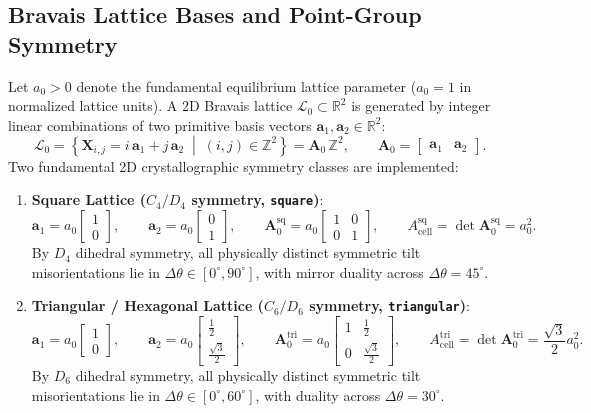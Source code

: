\documentclass[11pt,a4paper]{article}
\newcommand{\R}{\mathbb{R}}
\newcommand{\Z}{\mathbb{Z}}
\newcommand{\code}[1]{\texttt{#1}}
\begin{document}
\subsection{Bravais Lattice Bases and Point-Group Symmetry}
Let $a_0 > 0$ denote the fundamental equilibrium lattice parameter ($a_0 = 1$ in normalized lattice units). A 2D Bravais lattice $\mathcal{L}_0 \subset \R^2$ is generated by integer linear combinations of two primitive basis vectors $\mathbf{a}_1, \mathbf{a}_2 \in \R^2$:
\begin{equation}
  \mathcal{L}_0 = \left\{ \mathbf{X}_{i,j} = i\,\mathbf{a}_1 + j\,\mathbf{a}_2 \;\middle|\; (i,j) \in \Z^2 \right\} = \mathbf{A}_0\,\Z^2, \qquad \mathbf{A}_0 = \begin{bmatrix} \mathbf{a}_1 & \mathbf{a}_2 \end{bmatrix}.
\end{equation}
Two fundamental 2D crystallographic symmetry classes are implemented:
\begin{enumerate}
  \item \textbf{Square Lattice ($C_4 / D_4$ symmetry, \code{square})}:
  \begin{equation}
    \mathbf{a}_1 = a_0 \begin{bmatrix} 1 \\ 0 \end{bmatrix}, \qquad
    \mathbf{a}_2 = a_0 \begin{bmatrix} 0 \\ 1 \end{bmatrix}, \qquad
    \mathbf{A}_0^{\text{sq}} = a_0 \begin{bmatrix} 1 & 0 \\ 0 & 1 \end{bmatrix}, \qquad
    A_{\text{cell}}^{\text{sq}} = \det\mathbf{A}_0^{\text{sq}} = a_0^2.
  \end{equation}
  By $D_4$ dihedral symmetry, all physically distinct symmetric tilt misorientations lie in $\Delta\theta \in [0^\circ, 90^\circ]$, with mirror duality across $\Delta\theta = 45^\circ$.

  \item \textbf{Triangular / Hexagonal Lattice ($C_6 / D_6$ symmetry, \code{triangular})}:
  \begin{equation}
    \mathbf{a}_1 = a_0 \begin{bmatrix} 1 \\ 0 \end{bmatrix}, \qquad
    \mathbf{a}_2 = a_0 \begin{bmatrix} \tfrac{1}{2} \\ \tfrac{\sqrt{3}}{2} \end{bmatrix}, \qquad
    \mathbf{A}_0^{\text{tri}} = a_0 \begin{bmatrix} 1 & \tfrac{1}{2} \\ 0 & \tfrac{\sqrt{3}}{2} \end{bmatrix}, \qquad
    A_{\text{cell}}^{\text{tri}} = \det\mathbf{A}_0^{\text{tri}} = \frac{\sqrt{3}}{2}a_0^2.
  \end{equation}
  By $D_6$ dihedral symmetry, all physically distinct symmetric tilt misorientations lie in $\Delta\theta \in [0^\circ, 60^\circ]$, with duality across $\Delta\theta = 30^\circ$.
\end{enumerate}
\end{document}
